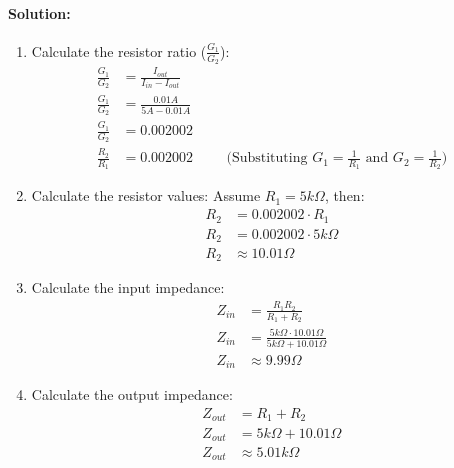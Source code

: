 \paragraph{Solution:}
\begin{enumerate}
  \item Calculate the resistor ratio (\(\frac{G_1}{G_2}\)):
    \begin{align*}
      \frac{G_1}{G_2} &= \frac{I_{out}}{I_{in} - I_{out}} \\
      \frac{G_1}{G_2} &= \frac{0.01A}{5A - 0.01A} \\
      \frac{G_1}{G_2} &= 0.002002 \\
      \frac{R_2}{R_1} &= 0.002002 \hspace{1cm} \text{(Substituting \(G_1 = \frac{1}{R_1}\) and \(G_2 = \frac{1}{R_2}\))}
    \end{align*}
  \item Calculate the resistor values:
    Assume \(R_1 = 5k\Omega\), then:
    \begin{align*}
      R_2 &= 0.002002 \cdot R_1 \\
      R_2 &= 0.002002 \cdot 5k\Omega \\
      R_2 &\approx 10.01 \Omega
    \end{align*}
  \item Calculate the input impedance:
    \begin{align*}
      Z_{in} &= \frac{R_1 R_2}{R_1 + R_2} \\
      Z_{in} &= \frac{5k\Omega \cdot 10.01 \Omega}{5k\Omega + 10.01 \Omega} \\
      Z_{in} &\approx 9.99 \Omega
    \end{align*}
  \item Calculate the output impedance:
    \begin{align*}
      Z_{out} &= R_1 + R_2 \\
      Z_{out} &= 5k\Omega + 10.01 \Omega \\
      Z_{out} &\approx 5.01 k\Omega
    \end{align*}
\end{enumerate}


